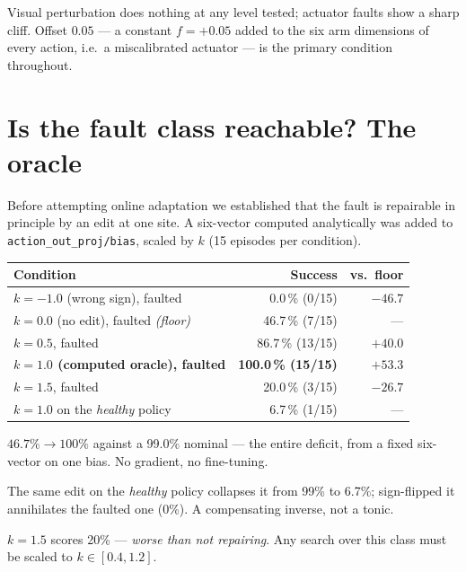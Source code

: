 \documentclass[11pt,a4paper]{article}
\newcommand{\code}[1]{\texttt{\small #1}}
\begin{document}
Visual perturbation does nothing at any level tested; actuator faults show a
sharp cliff. Offset $0.05$ --- a constant $f = +0.05$ added to the six arm
dimensions of every action, i.e.\ a miscalibrated actuator --- is the primary
condition throughout.

\section{Is the fault class reachable? The oracle}
\label{sec:oracle}

Before attempting online adaptation we established that the fault is repairable
in principle by an edit at one site. A six-vector computed analytically was
added to \code{action\_out\_proj/bias}, scaled by $k$ (15 episodes per condition).

\begin{center}
\begin{tabular}{lrr}
\toprule
\textbf{Condition} & \textbf{Success} & \textbf{vs.\ floor} \\
\midrule
$k = -1.0$ (wrong sign), faulted            & 0.0\,\% (0/15)  & $-46.7$ \\
$k = 0.0$ (no edit), faulted \emph{(floor)} & 46.7\,\% (7/15) & --- \\
$k = 0.5$, faulted                          & 86.7\,\% (13/15) & $+40.0$ \\
\textbf{$k = 1.0$ (computed oracle), faulted} & \textbf{100.0\,\% (15/15)} & $\mathbf{+53.3}$ \\
$k = 1.5$, faulted                          & 20.0\,\% (3/15) & $-26.7$ \\
$k = 1.0$ on the \emph{healthy} policy      & 6.7\,\% (1/15)  & --- \\
\bottomrule
\end{tabular}
\end{center}

\begin{description}[leftmargin=1.2em,style=nextline,itemsep=3pt]
\item[Complete.] $46.7\% \rightarrow 100\%$ against a 99.0\% nominal --- the
entire deficit, from a fixed six-vector on one bias. No gradient, no fine-tuning.
\item[Specific, not a general improvement.] The same edit on the \emph{healthy}
policy collapses it from 99\% to 6.7\%; sign-flipped it annihilates the faulted
one (0\%). A compensating inverse, not a tonic.
\item[Narrow basin.] $k = 1.5$ scores 20\% --- \emph{worse than not repairing}.
Any search over this class must be scaled to $k \in [0.4, 1.2]$.
\end{description}
\end{document}
